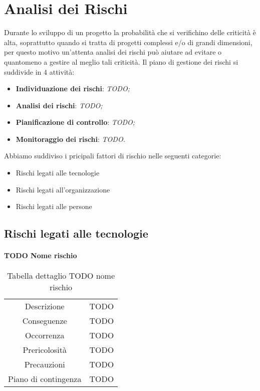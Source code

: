 \section{Analisi dei Rischi}
Durante lo sviluppo di un progetto la probabilità che si verifichino delle criticità è alta, 
soprattutto quando si tratta di progetti complessi e/o di grandi dimensioni, per questo motivo
un'attenta analisi dei rischi può aiutare ad evitare o quantomeno a gestire al meglio tali criticità.
Il piano di gestione dei rischi si suddivide in 4 attività:
\begin{itemize}
    \item \textbf{Individuazione dei rischi}: \textit{TODO;}
    \item \textbf{Analisi dei rischi}: \textit{TODO;}
    \item \textbf{Pianificazione di controllo}: \textit{TODO;}
    \item \textbf{Monitoraggio dei rischi}: \textit{TODO.}
\end{itemize}
Abbiamo suddiviso i pricipali fattori di rischio nelle seguenti categorie:
\begin{itemize}
    \item Rischi legati alle tecnologie
    \item Rischi legati all’organizzazione
    \item Rischi legati alle persone
\end{itemize}

\subsection{Rischi legati alle tecnologie}

\paragraph{TODO Nome rischio}
\renewcommand{\arraystretch}{1}
	\begin{table}[H]
		\begin{center}
			\setlength{\aboverulesep}{0pt}
			\setlength{\belowrulesep}{0pt}
			\setlength{\extrarowheight}{.75ex}
			\begin{tabular}{ c c }
				\rowcolor{AzzurroGruppo!30} 
                \toprule
                Descrizione & TODO \\
				Conseguenze & TODO \\
                Occorrenza & TODO \\
                Prericolosità & TODO \\
                Precauzioni & TODO \\
                Piano di contingenza & TODO \\
				\bottomrule
			\end{tabular}
			\caption{Tabella dettaglio TODO nome rischio}
		\end{center}
    \end{table}

